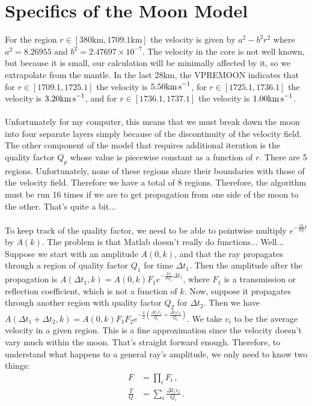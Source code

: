 \documentclass{article}
\newcommand*\te[1]{\text{#1}}
\newcommand*\p[1]{\left(#1\right)}
\newcommand*\f[2]{\frac{#1}{#2}}
\begin{document}
\section{Specifics of the Moon Model}
For the region $r \in [380\te{km},1709.1\te{km}]$ the velocity is given by $a^2 - b^2 r^2$ where $a^2 = 8.26955$ and $b^2 = 2.47697\times 10^{-7}$. The velocity in the core is not well known, but because it is small, our calculation will be minimally affected by it, so we extrapolate from the mantle. In the last 28km, the VPREMOON indicates that for $r\in [1709.1,1725.1]$ the velocity is $5.50\te{km\,s}^{-1}$, for $r\in[1725.1,1736.1]$ the velocity is $3.20\te{km\,s}^{-1}$, and for $r\in[1736.1,1737.1]$ the velocity is $1.00\te{km\,s}^{-1}$.
\\\\
Unfortunately for my computer, this means that we must break down the moon into four separate layers simply because of the discontinuity of the velocity field. The other component of the model that requires additional iteration is the quality factor $Q_p$ whose value is piecewise constant as a function of $r$. There are 5 regions. Unfortunately, none of these regions share their boundaries with those of the velocity field. Therefore we have a total of 8 regions. Therefore, the algorithm must be run 16 times if we are to get propagation from one side of the moon to the other. That's quite a bit...
\\\\
To keep track of the quality factor, we need to be able to pointwise multiply $e^{-\f{vk}{2Q}t}$ by $A(k)$. The problem is that Matlab doesn't really do functions... Well... Suppose we start with an amplitude $A(0,k)$, and that the ray propagates through a region of quality factor $Q_1$ for time $\Delta t_1$. Then the amplitude after the propagation is $A(\Delta t_1, k)=A(0,k)F_1 e^{-\f{kv}{2Q_1}\Delta t_1}$, where $F_1$ is a transmission or reflection coefficient, which is not a function of $k$. Now, suppose it propagates through another region with quality factor $Q_2$ for $\Delta t_2$. Then we have $A(\Delta t_1 + \Delta t_2, k)=A(0,k)F_1F_2 e^{-\f{k}{2}\p{\f{\Delta t_1v_1}{Q_1}+\f{\Delta t_2v_2}{Q_2}}}$. We take $v_i$ to be the average velocity in a given region. This is a fine approximation since the velocity doesn't vary much within the moon. That's straight forward enough. Therefore, to understand what happens to a general ray's amplitude, we only need to know two things:
\begin{align}
F &= \prod_i F_i\,,\\
\f{T}{Q} &= \sum_i\f{\Delta t_i v_i}{Q_i}\,.
\end{align}
\end{document}
